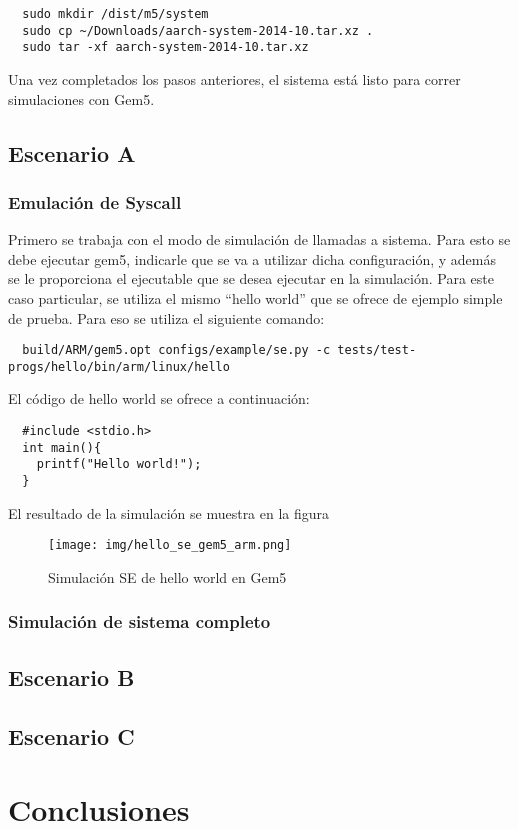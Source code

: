 \documentclass {article}
\begin{document}
\begin{lstlisting}
  sudo mkdir /dist/m5/system
  sudo cp ~/Downloads/aarch-system-2014-10.tar.xz .
  sudo tar -xf aarch-system-2014-10.tar.xz
\end{lstlisting}

Una vez completados los pasos anteriores, el sistema está listo para correr simulaciones con Gem5.

\subsection{Escenario A}

\subsubsection{Emulación de Syscall}
Primero se trabaja con el modo de simulación de llamadas a sistema. Para esto se debe ejecutar gem5,
indicarle que se va a utilizar dicha configuración, y además se le proporciona el ejecutable que se
desea ejecutar en la simulación. Para este caso particular, se utiliza el mismo ``hello world'' que se
ofrece de ejemplo simple de prueba. Para eso se utiliza el siguiente comando:

\begin{lstlisting}
  build/ARM/gem5.opt configs/example/se.py -c tests/test-progs/hello/bin/arm/linux/hello
\end{lstlisting}

El código de hello world se ofrece a continuación:

\begin{lstlisting}
  #include <stdio.h>
  int main(){
    printf("Hello world!");
  }
\end{lstlisting}

El resultado de la simulación se muestra en la figura %

\begin{figure}[H]
  \centering
  \texttt{[image: img/hello\_se\_gem5\_arm.png]}
  \caption{\label{fig:se_arm} Simulación SE de hello world en Gem5}
\end{figure}

\subsubsection{Simulación de sistema completo}



\subsection{Escenario B}

\subsection{Escenario C}


\section{Conclusiones}





\end{document}
